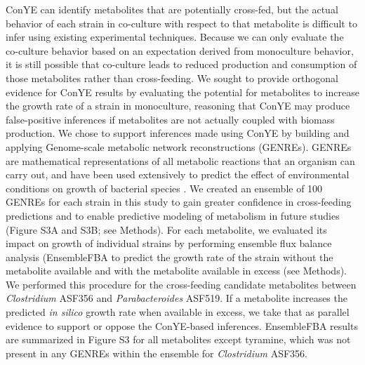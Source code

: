 \documentclass[11pt,twocolumn,notitlepage,openany,twoside]{book}
\begin{document}
\begin{refsection}
ConYE can identify metabolites that are potentially cross-fed, but the actual behavior of each strain in co-culture with respect to that metabolite is difficult to infer using existing experimental techniques. Because we can only evaluate the co-culture behavior based on an expectation derived from monoculture behavior, it is still possible that co-culture leads to reduced production and consumption of those metabolites rather than cross-feeding. We sought to provide orthogonal evidence for ConYE results by evaluating the potential for metabolites to increase the growth rate of a strain in monoculture, reasoning that ConYE may produce false-positive inferences if metabolites are not actually coupled with biomass production. We chose to support inferences made using ConYE by building and applying Genome-scale metabolic network reconstructions (GENREs). GENREs are mathematical representations of all metabolic reactions that an organism can carry out, and have been used extensively to predict the effect of environmental conditions on growth of bacterial species \cite{Oberhardt2009-iu}. We created an ensemble of 100 GENREs for each strain in this study to gain greater confidence in cross-feeding predictions and to enable predictive modeling of metabolism in future studies (Figure S3A and S3B; see Methods). For each metabolite, we evaluated its impact on growth of individual strains by performing ensemble flux balance analysis (EnsembleFBA \cite{Biggs2017-md} to predict the growth rate of the strain without the metabolite available and with the metabolite available in excess (see Methods). We performed this procedure for the cross-feeding candidate metabolites between \textit{Clostridium} ASF356 and \textit{Parabacteroides} ASF519. If a metabolite increases the predicted \textit{in silico} growth rate when available in excess, we take that as parallel evidence to support or oppose the ConYE-based inferences. EnsembleFBA results are summarized in Figure S3 for all metabolites except tyramine, which was not present in any GENREs within the ensemble for \textit{Clostridium} ASF356.


\end{refsection}
\end{document}
